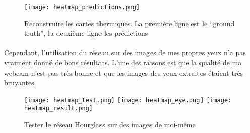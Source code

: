 \begin{figure}[H]
    \centering
    \texttt{[image: heatmap\_predictions.png]}
    \caption{Reconstruire les cartes thermiques. La première ligne est le ``ground truth'', la deuxième ligne les prédictions}
\end{figure}

\paragraph{}
Cependant, l'utilisation du réseau sur des images de mes propres yeux n'a pas vraiment donné de bons résultats.
L'une des raisons est que la qualité de ma webcam n'est pas très bonne et que les images des yeux extraites étaient très bruyantes.

\begin{figure}[H]
    \centering
    \texttt{[image: heatmap\_test.png]}
    \texttt{[image: heatmap\_eye.png]}
    \texttt{[image: heatmap\_result.png]}
    \caption{Tester le réseau Hourglass sur des images de moi-même}
\end{figure}









